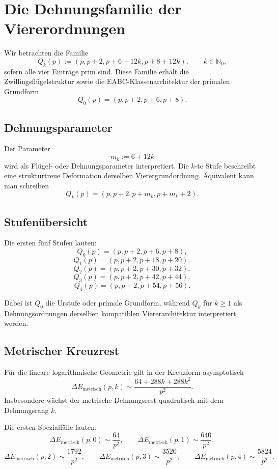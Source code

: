 
\section{Die Dehnungsfamilie der Viererordnungen}

Wir betrachten die Familie
\[
Q_k(p):=(p,p+2,p+6+12k,p+8+12k),
\qquad k\in\mathbb N_0,
\]
sofern alle vier Einträge prim sind. Diese Familie erhält die Zwillingsflügelstruktur sowie die EABC-Klassenarchitektur der primalen Grundform
\[
Q_0(p)=(p,p+2,p+6,p+8).
\]

\subsection{Dehnungsparameter}

Der Parameter
\[
m_k:=6+12k
\]
wird als Flügel- oder Dehnungsparameter interpretiert. Die \(k\)-te Stufe beschreibt eine strukturtreue Deformation derselben Vierergrundordnung. Äquivalent kann man schreiben
\[
Q_k(p)=(p,p+2,p+m_k,p+m_k+2).
\]

\subsection{Stufenübersicht}

Die ersten fünf Stufen lauten:
\[
Q_0(p)=(p,p+2,p+6,p+8),
\]
\[
Q_1(p)=(p,p+2,p+18,p+20),
\]
\[
Q_2(p)=(p,p+2,p+30,p+32),
\]
\[
Q_3(p)=(p,p+2,p+42,p+44),
\]
\[
Q_4(p)=(p,p+2,p+54,p+56).
\]

Dabei ist \(Q_0\) die Urstufe oder primale Grundform, während \(Q_k\) für \(k\ge 1\) als Dehnungsordnungen derselben kompatiblen Viererarchitektur interpretiert werden.

\subsection{Metrischer Kreuzrest}

Für die lineare logarithmische Geometrie gilt in der Kreuzform asymptotisch
\[
\Delta E_{\mathrm{metrisch}}(p,k)
\sim
\frac{64+288k+288k^2}{p^2}.
\]
Insbesondere wächst der metrische Dehnungsrest quadratisch mit dem Dehnungsrang \(k\).

Die ersten Spezialfälle lauten:
\[
\Delta E_{\mathrm{metrisch}}(p,0)\sim \frac{64}{p^2},
\qquad
\Delta E_{\mathrm{metrisch}}(p,1)\sim \frac{640}{p^2},
\]
\[
\Delta E_{\mathrm{metrisch}}(p,2)\sim \frac{1792}{p^2},
\qquad
\Delta E_{\mathrm{metrisch}}(p,3)\sim \frac{3520}{p^2},
\qquad
\Delta E_{\mathrm{metrisch}}(p,4)\sim \frac{5824}{p^2}.
\]

